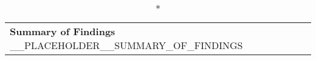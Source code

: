 \renewcommand{\floatpagefraction}{.5}%
\renewcommand{\textfraction}{.2}%
\renewcommand{\topfraction}{.7}%
\renewcommand{\bottomfraction}{.3}%
\setcounter{topnumber}{2}
\setcounter{bottomnumber}{1}
\setcounter{totalnumber}{3}

\begin{longtable}{|p{12cm}|p{3cm}|}
  \caption*{\textbf{Summary of Findings}}
    __PLACEHOLDER__SUMMARY_OF_FINDINGS
\end{longtable}
